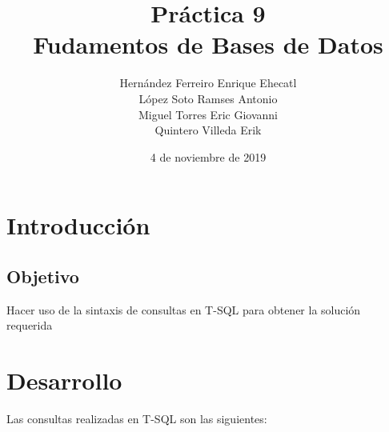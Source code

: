 \documentclass[12pt, letterpaper]{article}
\author{Hernández Ferreiro Enrique Ehecatl \\
        López Soto Ramses Antonio \\
        Miguel Torres Eric Giovanni \\
        Quintero Villeda Erik}
\title{Práctica 9 \\
       {\small Fudamentos de Bases de Datos}}
\date{4 de noviembre de 2019}
\begin{document}
    \maketitle

    \section*{Introducción}
        
        \subsection*{Objetivo}
        Hacer uso de la sintaxis de consultas en T-SQL para obtener la solución requerida

    \section*{Desarrollo}
    Las consultas realizadas en T-SQL son las siguientes:
\end{document}
